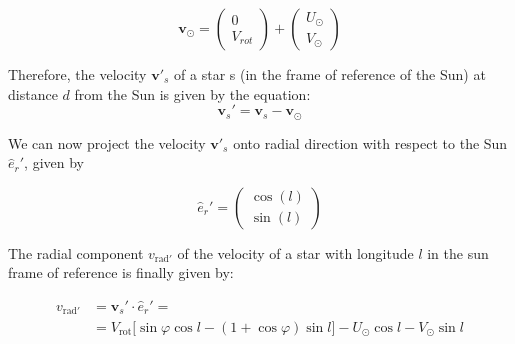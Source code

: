 \begin{equation}\label{eq:VSun}
    \bm{v}_{\odot} = \begin{pmatrix} 0 \\ V_{rot} \end{pmatrix} + \begin{pmatrix} U_{\odot} \\ V_{\odot} \end{pmatrix}
\end{equation}

\noindent
Therefore, the velocity $\bm{v'}_s$ of a star s (in the frame of reference of the Sun) at distance $d$ from the Sun is given by the equation:
\begin{equation}\label{eq:ReferenceFrame}
    \bm{v}_s' = \bm{v}_s - \bm{v}_{\odot} 
\end{equation}

\noindent 
We can now project the velocity $\bm{v'}_s$ onto radial direction with respect to the Sun $\hat{e}_r'$, given by

\begin{equation}\label{eq:radialverson}
    \hat{e}_r' = \begin{pmatrix} \cos(l) \\ \sin(l) \end{pmatrix}
\end{equation}
\noindent

The radial component $v_{\text{rad}'}$ of the velocity of a star with longitude $l$ in the sun frame of reference is finally given by:



\begin{equation}\label{eq:VSunRad}
    \begin{aligned}
        v_{\text{rad}'}  &= \bm{v}_s' \cdot \hat{e}_r' = \\ 
        &=V_{\text{rot}} \biggl[ \sin\varphi \cos l - (1 + \cos\varphi)\sin l \biggr] - U_{\odot} \cos l - V_{\odot} \sin l
    \end{aligned}
\end{equation}
\noindent


